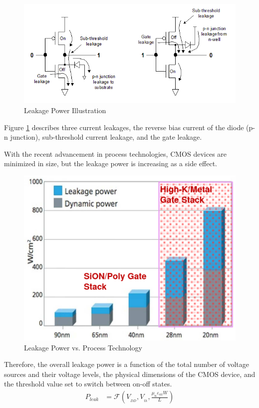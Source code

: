 \begin{figure}[H]
    \centering
    \includegraphics[width=0.75\linewidth]{Features/images/leak_power_schem}
    \caption{Leakage Power Illustration}\label{fig:leak_power_schem}
\end{figure}

Figure \ref{fig:leak_power_schem} describes three current leakages,
the reverse bias current of the diode (p-n junction), sub-threshold current leakage, and
the gate leakage.

With the recent advancement in process technologies, 
CMOS devices are minimized in size, 
but the leakage power is increasing as a side effect.
\begin{figure}[H]
    \centering
    \includegraphics[width=0.55\linewidth]{Features/images/leak_vs_nm}
    \caption{Leakage Power vs. Process Technology}\label{fig:leak_vs_nm}
\end{figure}
Therefore, the overall leakage power is a function 
of the total number of voltage sources and their voltage levels, 
the physical dimensions of the CMOS device, 
and the threshold value set to switch between on-off states.
\begin{align}
    P_{leak} & = \mathcal{F} (V_{_{DD}}, V_{_{th}}, \frac{\mu_{n}\varepsilon_{ox} W}{L})
\end{align}


